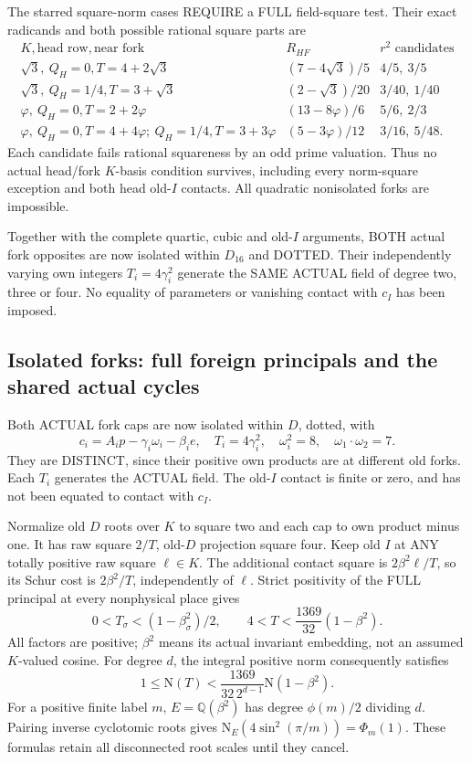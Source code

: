 \documentclass[11pt]{article}
\begin{document}
The starred square-norm cases REQUIRE
a FULL field-square test.
Their exact radicands and both possible
rational square parts are
\[
\begin{array}{c|c|c}
 K,\text{head row},\text{near fork}&R_{HF}&r^2\text{ candidates}\\ \hline
 \sqrt3,\ Q_H=0,T=4+2\sqrt3&(7-4\sqrt3)/5&4/5,\ 3/5\\
 \sqrt3,\ Q_H=1/4,T=3+\sqrt3&(2-\sqrt3)/20&3/40,\ 1/40\\
 \varphi,\ Q_H=0,T=2+2\varphi&(13-8\varphi)/6&5/6,\ 2/3\\
 \varphi,\ Q_H=0,T=4+4\varphi;\
 Q_H=1/4,T=3+3\varphi&(5-3\varphi)/12&3/16,\ 5/48 .
\end{array}
\]
Each candidate fails rational squareness
by an odd prime valuation.
Thus no actual head/fork \(K\)-basis
condition survives, including every
norm-square exception and both head
old-\(I\) contacts.
All quadratic nonisolated forks are
impossible.

Together with the complete quartic,
cubic and old-\(I\) arguments, BOTH
actual fork opposites are now isolated
within \(D_{16}\) and DOTTED.
Their independently varying own integers
\(T_i=4\gamma_i^2\) generate the SAME
ACTUAL field of degree two, three
or four.
No equality of parameters or vanishing
contact with \(c_I\) has been imposed.

\subsection{Isolated forks: full foreign principals and the shared actual cycles}
\label{app:arithD16Iisolatedcommon}

Both ACTUAL fork caps are now isolated
within \(D\), dotted, with
\[
            c_i=A_ip-\gamma_i\omega_i-\beta_i e,\quad
            T_i=4\gamma_i^2,\quad\omega_i^2=8,\quad
            \omega_1\cdot\omega_2=7 .
\]
They are DISTINCT, since their positive
own products are at different old forks.
Each \(T_i\) generates the ACTUAL field.
The old-\(I\) contact is finite or zero,
and has not been equated to contact
with \(c_I\).

Normalize old \(D\) roots over \(K\)
to square two and each cap to own
product minus one.
It has raw square \(2/T\), old-\(D\)
projection square four.
Keep old \(I\) at ANY totally positive
raw square \(\ell\in K\).
The additional contact square is
\(2\beta^2\ell/T\), so its Schur cost
is \(2\beta^2/T\), independently of
\(\ell\).
Strict positivity of the FULL principal
at every nonphysical place gives
\[
             0<T_\sigma<(1-\beta_\sigma^2)/2,\qquad
             4<T<{\frac{1369}{32}}(1-\beta^2).
\tag{D16Ifull}\label{eq:arithD16Iisolatedfull}
\]
All factors are positive; \(\beta^2\)
means its actual invariant embedding,
not an assumed \(K\)-valued cosine.
For degree \(d\), the integral positive
norm consequently satisfies
\[
              1\le\mathrm N(T)<
                   {\frac{1369}{32\,2^{d-1}}}\mathrm N(1-\beta^2).
\]
For a positive finite label \(m\),
\(E=\mathbb Q(\beta^2)\) has degree
\(\phi(m)/2\) dividing \(d\).
Pairing inverse cyclotomic roots gives
\(\mathrm N_E(4\sin^2(\pi/m))=\Phi_m(1)\).
These formulas retain all disconnected
root scales until they cancel.
\end{document}
